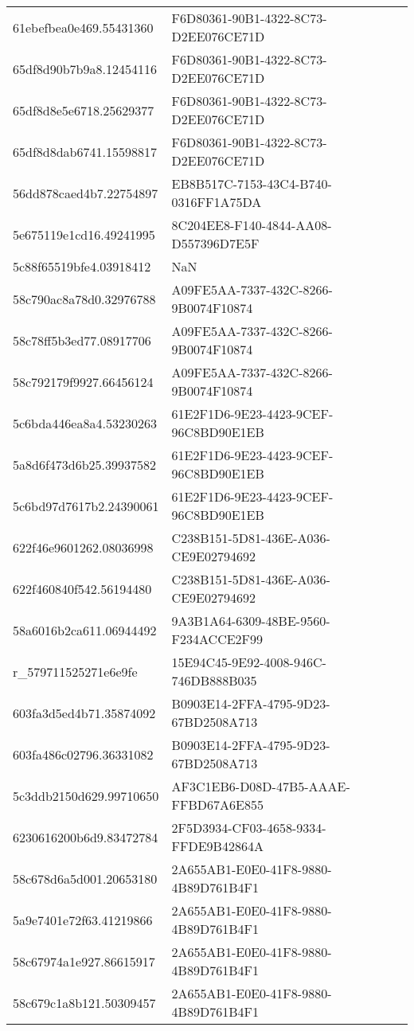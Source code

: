 \begin{tabular}{ll}
61ebefbea0e469.55431360 & F6D80361-90B1-4322-8C73-D2EE076CE71D \\
65df8d90b7b9a8.12454116 & F6D80361-90B1-4322-8C73-D2EE076CE71D \\
65df8d8e5e6718.25629377 & F6D80361-90B1-4322-8C73-D2EE076CE71D \\
65df8d8dab6741.15598817 & F6D80361-90B1-4322-8C73-D2EE076CE71D \\
56dd878caed4b7.22754897 & EB8B517C-7153-43C4-B740-0316FF1A75DA \\
5e675119e1cd16.49241995 & 8C204EE8-F140-4844-AA08-D557396D7E5F \\
5c88f65519bfe4.03918412 & NaN \\
58c790ac8a78d0.32976788 & A09FE5AA-7337-432C-8266-9B0074F10874 \\
58c78ff5b3ed77.08917706 & A09FE5AA-7337-432C-8266-9B0074F10874 \\
58c792179f9927.66456124 & A09FE5AA-7337-432C-8266-9B0074F10874 \\
5c6bda446ea8a4.53230263 & 61E2F1D6-9E23-4423-9CEF-96C8BD90E1EB \\
5a8d6f473d6b25.39937582 & 61E2F1D6-9E23-4423-9CEF-96C8BD90E1EB \\
5c6bd97d7617b2.24390061 & 61E2F1D6-9E23-4423-9CEF-96C8BD90E1EB \\
622f46e9601262.08036998 & C238B151-5D81-436E-A036-CE9E02794692 \\
622f460840f542.56194480 & C238B151-5D81-436E-A036-CE9E02794692 \\
58a6016b2ca611.06944492 & 9A3B1A64-6309-48BE-9560-F234ACCE2F99 \\
r_579711525271e6e9fe & 15E94C45-9E92-4008-946C-746DB888B035 \\
603fa3d5ed4b71.35874092 & B0903E14-2FFA-4795-9D23-67BD2508A713 \\
603fa486c02796.36331082 & B0903E14-2FFA-4795-9D23-67BD2508A713 \\
5c3ddb2150d629.99710650 & AF3C1EB6-D08D-47B5-AAAE-FFBD67A6E855 \\
6230616200b6d9.83472784 & 2F5D3934-CF03-4658-9334-FFDE9B42864A \\
58c678d6a5d001.20653180 & 2A655AB1-E0E0-41F8-9880-4B89D761B4F1 \\
5a9e7401e72f63.41219866 & 2A655AB1-E0E0-41F8-9880-4B89D761B4F1 \\
58c67974a1e927.86615917 & 2A655AB1-E0E0-41F8-9880-4B89D761B4F1 \\
58c679c1a8b121.50309457 & 2A655AB1-E0E0-41F8-9880-4B89D761B4F1 \\

\end{tabular}
